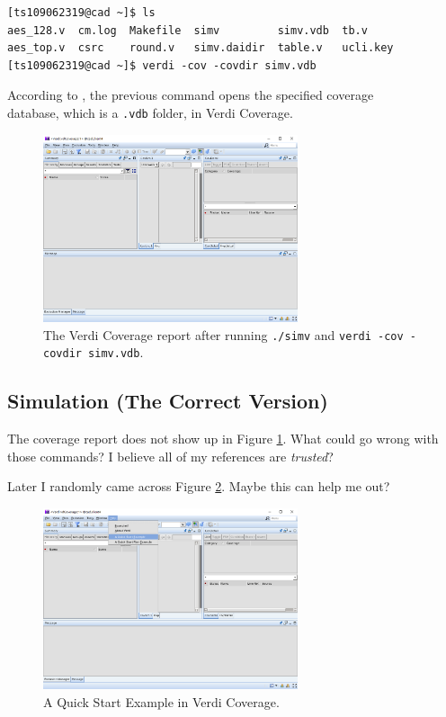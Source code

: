 \documentclass{article}
\begin{document}
\begin{verbatim}
[ts109062319@cad ~]$ ls
aes_128.v  cm.log  Makefile  simv         simv.vdb  tb.v
aes_top.v  csrc    round.v   simv.daidir  table.v   ucli.key
[ts109062319@cad ~]$ verdi -cov -covdir simv.vdb
\end{verbatim}

According to \cite{ytverdicov}, the previous command opens the specified coverage\\database, which is a \verb|.vdb| folder, in Verdi Coverage.

\begin{figure}[t] \centering
\includegraphics[width=0.666667\textwidth]{simv_no_cm}
\caption{The Verdi Coverage report after running \texttt{./simv} and \texttt{verdi -cov -covdir simv.vdb}.}
\label{simv_no_cm}
\end{figure}

\subsection{Simulation (The Correct Version)}

The coverage report does not show up in Figure \ref{simv_no_cm}. What could go wrong with those commands? I believe all of my references are \textit{trusted}?

Later I randomly came across Figure \ref{A Quick Start Example}. Maybe this can help me out?

\begin{figure}[h] \centering
\includegraphics[width=0.666667\textwidth]{A Quick Start Example}
\caption{A Quick Start Example in Verdi Coverage.}
\label{A Quick Start Example}
\end{figure}
\end{document}
